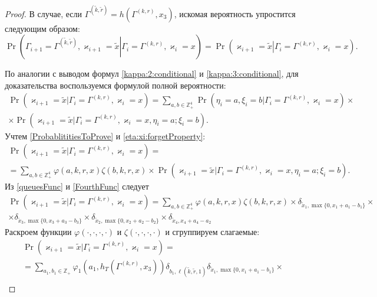 \documentclass[a4paper,12pt,russian]{extarticle}
\begin{document}
\begin{proof}
В случае, если $\Gamma^{(\tilde{k},\tilde{r})}=h(\Gamma^{(k,r)},x_3)$, искомая вероятность упростится следующим образом:
\begin{equation*}
\Pr \left(\left.\Gamma_{i+1}=\Gamma^{(\tilde{k},\tilde{r})},\varkappa_{i+1}=\tilde{x}\right| \Gamma_{i}=\Gamma^{(k,r)},\varkappa_i=x\right) 
=\Pr \left(\left.\varkappa_{i+1}=\tilde{x}\right|\Gamma_{i}=\Gamma^{(k,r)},\varkappa_i=x\right).
\end{equation*}

По аналогии с выводом формул \eqref{kappa:2:conditional} и \eqref{kappa:3:conditional}, для доказательства воспользуемся формулой полной вероятности:
\begin{multline*}
\Pr (\varkappa_{i+1}=\tilde{x}|\Gamma_{i}=\Gamma^{(k,r)},\varkappa_i=x)= \sum_{a,b \in \mathbb{Z}_+^4} \Pr (\eta_i=a, \xi_i=b|\Gamma_{i}=\Gamma^{(k,r)},\varkappa_i=x) \times \\ 
\times
\Pr (\varkappa_{i+1}=\tilde{x}|\Gamma_{i}=\Gamma^{(k,r)},\varkappa_i=x, \eta_i=a; \xi_i=b).
\end{multline*}
Учтем \eqref{ProbablititiesToProve} и \eqref{eta:xi:forgetProperty}:
\begin{multline*}
\Pr (\varkappa_{i+1}=\tilde{x}|\Gamma_{i}=\Gamma^{(k,r)},\varkappa_i=x)= \\
=\sum_{a,b \in \mathbb{Z}_+^4} \varphi(a,k,r,x) \zeta(b,k,r,x)
\times
\Pr (\varkappa_{i+1}=\tilde{x}|\Gamma_{i}=\Gamma^{(k,r)},\varkappa_i=x, \eta_i=a; \xi_i=b).
\end{multline*}
Из \eqref{queuesFunc} и \eqref{FourthFunc} следует
\begin{multline*}
\Pr (\varkappa_{i+1}=\tilde{x}|\Gamma_{i}=\Gamma^{(k,r)},\varkappa_i=x)=\sum_{a,b \in \mathbb{Z}_+^4} \varphi(a,k,r,x) \zeta(b,k,r,x)
\times \delta_{\tilde{x}_1,\max{\{0,x_1+a_1-b_1\}}} \times \\
\times \delta_{\tilde{x}_3,\max{\{0,x_3+a_3-b_3\}}} \times
\delta_{\tilde{x}_2,\max{\{0,x_2+a_2-b_2\}}} \times
\delta_{\tilde{x}_4,x_4+a_4-a_2}
\end{multline*}
Раскроем функции $\varphi(\cdot, \cdot, \cdot, \cdot)$ и $\zeta(\cdot, \cdot, \cdot, \cdot)$ и сгруппируем слагаемые:
\begin{multline*}
\Pr (\varkappa_{i+1}=\tilde{x}|\Gamma_{i}=\Gamma^{(k,r)},\varkappa_i=x)= \\
=\sum_{a_1,b_1 \in \mathbb{Z}_+} \varphi_1(a_1,h_T(\Gamma^{(k,r)},x_3)) \delta_{b_1,\ell(\tilde{k},\tilde{r},1)} \delta_{\tilde{x}_1,\max{\{0,x_1+a_1-b_1\}}} \times \\

\end{multline*}
\end{proof}
\end{document}
